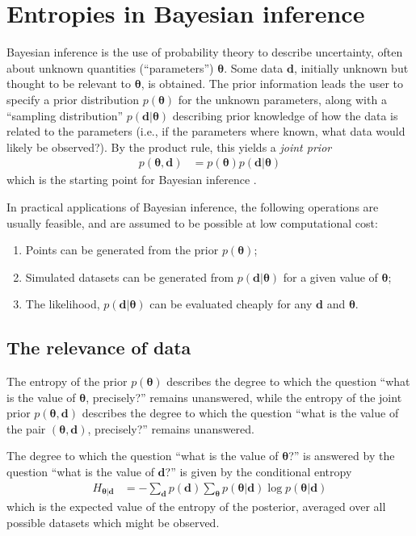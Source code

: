 \documentclass[entropy,article,accept,oneauthor,pdftex,10pt,a4paper]{mdpi}
\renewcommand{\d}{\boldsymbol{d}}
\newcommand{\x}{\boldsymbol{\theta}}
\begin{document}
\section{Entropies in Bayesian inference}

Bayesian inference is the use of probability theory to
describe uncertainty, often about unknown quantities
(``parameters'') $\x$. Some data $\d$, initially unknown but
thought to be relevant to $\x$, is obtained.
The prior information leads the
user to specify a prior distribution $p(\x)$ for the unknown parameters,
along with a ``sampling distribution'' $p(\d | \x)$ describing prior knowledge
of how the data is related to the parameters
(i.e., if the parameters where known, what data would likely be observed?). By the product rule, this yields a {\em joint prior}
\begin{align}
p(\x, \d) &= p(\x)p(\d | \x)
\end{align}
which is the starting point for
Bayesian inference \citep{caticha2008lectures}.

In practical applications of Bayesian inference, the following operations
are usually feasible, and are assumed to be possible at low computational
cost:
\begin{enumerate}
\item Points can be generated from the prior $p(\x)$;
\item Simulated datasets can be generated from $p(\d | \x)$ for a given value of $\x$;
\item The likelihood, $p(\d | \x)$ can be evaluated cheaply for any $\d$ and $\x$.
\end{enumerate}

\subsection{The relevance of data}

The entropy of the prior $p(\x)$ describes the degree to which the question
``what is the value of $\x$, precisely?'' remains unanswered, while the
entropy of the joint prior $p(\x, \d)$
describes the degree to which the question
``what is the value of the pair $(\x, \d)$, precisely?'' remains unanswered.


The degree to which the question ``what is the value of $\x$?'' is
answered by the question ``what is the value of $\d$?'' is given by the
conditional entropy
\begin{align}
H_{\x | \d} &= - \sum_{\d} p(\d) \sum_{\x} p(\x | \d) \log p(\x | \d)
\end{align}
which is the expected value of the entropy of the posterior, averaged over
all possible datasets which might be observed. 
\end{document}
